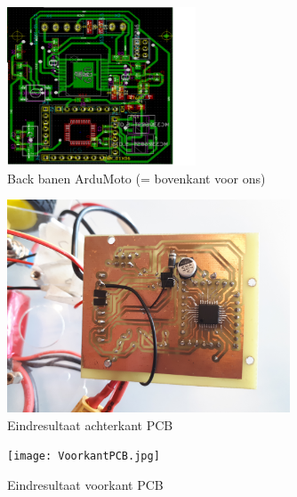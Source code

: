 \begin{figure}[h]
\centering
\includegraphics[width=0.5\textwidth]{Back.png}
\caption{Back banen ArduMoto (= bovenkant voor ons)}
\label{fig:back}
\end{figure}

\begin{figure}[h]
\centering
\includegraphics[width=0.75\textwidth]{AchterkantPCB.jpg}
\caption{Eindresultaat achterkant PCB}
\label{fig:achterkantPCB}
\end{figure}

\begin{figure}[h]
\centering
\texttt{[image: VoorkantPCB.jpg]}
\caption{Eindresultaat voorkant PCB}
\label{fig:voorkantPCB}
\end{figure}
